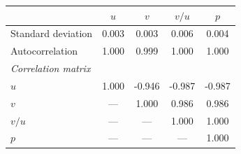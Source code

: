 \caption{Results from the calibrated model}
\begin{tabular}{lcccc}
\toprule
 & $u$ & $v$ & $v/u$ & $p$ \\
\midrule
Standard deviation        &  0.003 &  0.003 &  0.006 &  0.004 \\
Autocorrelation           &  1.000 &  0.999 &  1.000 &  1.000 \\
\midrule
\multicolumn{5}{l}{\textit{Correlation matrix}} \\
$u$   &  1.000 & -0.946 & -0.987 & -0.987 \\
$v$   &   ---  &  1.000 &  0.986 &  0.986 \\
$v/u$ &   ---  &   ---  &  1.000 &  1.000 \\
$p$   &   ---  &   ---  &   ---  &  1.000 \\
\bottomrule
\end{tabular}
